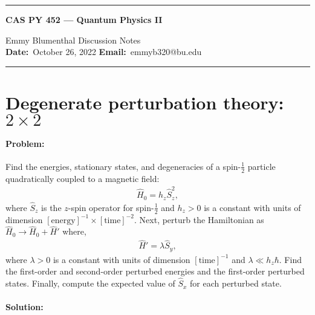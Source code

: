 \documentclass[10pt]{article}
\newcommand{\1}{\mathbf 1}
\begin{document}
\begin{center}
	\hrule
	\vspace{.4cm}
	{\textbf { \large CAS PY 452 --- Quantum Physics II}}
\end{center}
Emmy Blumenthal \hspace{\fill} \hspace{\fill}  \textbf{} Discussion Notes\  \\
\textbf{Date:}\  October 26, 2022   \hspace{\fill} \textbf{Email:}\ emmyb320@bu.edu

\vspace{.4cm}
\hrule





\section*{Degenerate perturbation theory: $2 \times 2$}

\paragraph{Problem:}

Find the energies, stationary states, and degeneracies of a spin-$\frac{1}{2}$ particle quadratically coupled to a magnetic field:
\begin{align}
	\hat H_0 = h_z \hat S_z^2,
\end{align}
where $\hat S_z$ is the $z$-spin operator for spin-$\frac{1}{2}$ and $h_z > 0$ is a constant with units of dimension $[\text{energy}]^{-1} \times [\text{time}]^{-2}$.
Next, perturb the Hamiltonian as $\hat H_0 \to \hat H_0 + \hat H'$ where,
\begin{align}
	\hat H' = \lambda \hat S_y,
\end{align}
where $\lambda > 0$ is a constant with units of dimension $[\text{time}]^{-1}$ and $\lambda \ll h_z \hbar$.
Find the first-order and second-order perturbed energies and the first-order perturbed states.
Finally, compute the expected value of $\hat S_x$ for each perturbed state.

\paragraph{Solution:}
\end{document}
